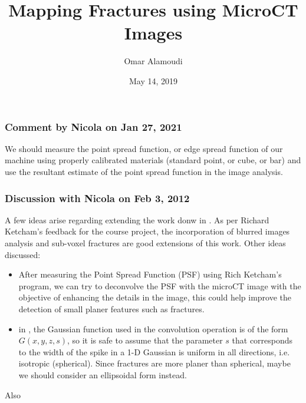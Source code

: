 \documentclass[usletter, 11pt, titlepage]{article}
\title{Mapping Fractures using MicroCT Images}
\author{Omar Alamoudi}
\date{May 14, 2019}
\begin{document}
\maketitle
\subsubsection*{Comment by Nicola on Jan 27, 2021}
We should measure the point spread function, or edge spread function of our machine using properly calibrated materials (standard point, or cube, or bar) and use the resultant estimate of the point spread function in the image analysis. 

\subsubsection*{Discussion with Nicola on Feb 3, 2012}
A few ideas arise regarding extending the work donw in \cite{Voorn2013}. As per Richard Ketcham's feedback for the course project, the incorporation of blurred images analysis and sub-voxel fractures are good extensions of this work. Other ideas discussed:
\begin{itemize}
	\item After measuring the Point Spread Function (PSF) using Rich Ketcham's program, we can try to deconvolve the PSF with the microCT image with the objective of enhancing the details in the image, this could help improve the detection of small planer features such as fractures. 
	\item in \cite{Voorn2013}, the Gaussian function used in the convolution operation is of the form $ G(x,y,z,s)$, so it is safe to assume that the parameter $s$ that corresponds to the width of the spike in a 1-D Gaussian is uniform in all directions, i.e. isotropic (spherical). Since fractures are more planer than spherical, maybe we should consider an ellipsoidal form instead. 
\end{itemize} 

Also
\end{document}
